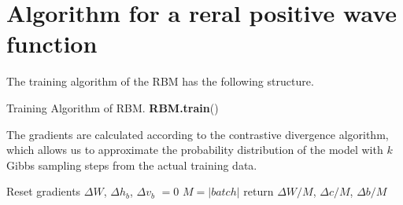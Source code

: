 \documentclass[submission, Phys]{SciPost}
\begin{document}
\section{Algorithm for a reral positive wave function}
The training algorithm of the RBM has the following structure.
 
\begin{algorithm}[H]
	 \caption{Training Algorithm of RBM. \textbf{RBM.train}() }
  \SetAlgoLined
 
\end{algorithm}


The gradients are calculated according to the contrastive divergence algorithm, which allows us to approximate the probability distribution of the model with $k$ Gibbs sampling steps from the actual training data.

\begin{algorithm}[H]
	 \caption{Compute Gradient from Batch. \textbf{\lstinline{RBM.compute_batch_gradients}}(k, batch) }
  \SetAlgoLined
  Reset gradients $\Delta W$, $\Delta h_b$, $\Delta v_b$ $= 0$\;
 $M = \vert batch \vert$ \;
 return $\Delta W / M$,  $\Delta c / M$, $\Delta b / M$
\end{algorithm}
\end{document}
